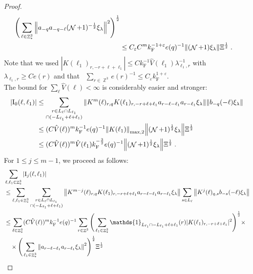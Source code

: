 \documentclass[12pt,a4paper]{article}
\numberwithin{equation}{section}
\newcommand{\1}{\mathbb{I}}
\newcommand{\F}{\mathrm{F}}
\newcommand{\I}{\mathrm{I}}
\DeclareMathOperator{\Z}{\mathbb{Z}}
\DeclareMathOperator{\NN}{\mathcal{N}}
\newcommand{\half}{\frac{1}{2}}
\theoremstyle{plain}
\theoremstyle{definition}
\theoremstyle{remark}
\theoremstyle{plain}
\theoremstyle{definition}
\theoremstyle{remark}
\begin{document}
\begin{proof}
{\begin{align}
		\Bigg( \sum_{\ell \in \Z^3_*} \norm{ a_{-q} a_{-q-\ell} (\NN+1)^{-\half} \xi_\lambda}^2 \Bigg)^{\half} \nonumber\\
	&\leq C_\varepsilon C^m k_{\F}^{-1 + \varepsilon} e(q)^{-1}
		\norm{ (\NN+1) \xi_\lambda } \Xi^{\half} \;. \label{eq:estEQ2151_Coulomb}
\end{align}
Note that we used $ |K(\ell_1)_{r,-r+\ell+\ell_1}| \le C k_{\F}^{-1} \hat{V}(\ell_1) \lambda_{\ell_1,r}^{-1} $ with $ \lambda_{\ell_1,r} \ge C e(r) $ and that~\cite[Lemma~3.2]{CHN24} $ \sum_{r \in \Z^3} e(r)^{-1} \le C_\varepsilon k_{\F}^{1+\varepsilon} $.\\
The bound for $ \sum_{\ell} \hat{V}(\ell) < \infty $ is considerably easier and stronger:
}
\begin{align}
	|\I_0(\ell, \ell_1)|
	&\leq \sum\limits_{\substack{r\in L_{\ell} \cap L_{\ell_1} \\ \cap (-L_{\ell_1}+\ell+\ell_1)}} \norm{K^m(\ell)_{r,q} K(\ell_1)_{r,-r+\ell+\ell_1} a_{r-\ell-\ell_1} a_{r-\ell_1} \xi_\lambda}\norm{ b_{-q}(-\ell) \xi_\lambda}\nonumber\\
	&\leq (C \hat{V}(\ell))^m k_{\F}^{-1} e(q)^{-1}
		\norm{K(\ell_1)}_{\max,2} \norm{ (\NN+1)^\half \xi_\lambda } \Xi^{\half} \nonumber\\
	&\leq (C \hat{V}(\ell))^m
		\hat{V}(\ell_1)
		k_{\F}^{-\frac 32} e(q)^{-1}
		\norm{ (\NN+1)^\half \xi_\lambda } \Xi^{\half} \;. \label{eq:estEQ2151}
\end{align}
\textcolor{green!30!black}{
For $ 1 \le j \le m-1 $, we proceed as follows:
\begin{align}
	&\sum_{\ell,\ell_1 \in \Z^3_*} |\I_j(\ell, \ell_1)| \nonumber\\
	&\leq \sum_{\ell,\ell_1 \in \Z^3_*} \sum\limits_{\substack{r\in L_{\ell} \cap L_{\ell_1}\\ \cap (-L_{\ell_1}+\ell+\ell_1)}}
		\norm{ K^{m-j}(\ell)_{r,q} K(\ell_1)_{r,-r+\ell+\ell_1} a_{r-\ell-\ell_1} a_{r-\ell_1} \xi_\lambda}
		\sum\limits_{s \in L_{\ell}}
		\norm{ K^j(\ell)_{q,s} b_{-s}(-\ell) \xi_\lambda }\nonumber\\
	&\leq \sum_{\ell \in \Z^3_*} (C \hat{V}(\ell))^m k_{\F}^{-1} e(q)^{-1}
		\sum_{r \in \Z^3}
		\Bigg( \sum_{\ell_1 \in \Z^3_*} \mathds{1}_{L_{\ell_1} \cap -L_{\ell_1}+\ell+\ell_1 }(r) |K(\ell_1)_{r,-r+\ell+\ell_1}|^2 \Bigg)^{\half} \times \nonumber\\
	&\quad \times \Bigg( \sum_{\ell_1 \in \Z^3_*} \norm{ a_{r-\ell-\ell_1} a_{r-\ell_1} \xi_\lambda}^2 \Bigg)^{\half}
		\Xi^\half \nonumber\\

\end{align}}
\end{proof}
\end{document}

